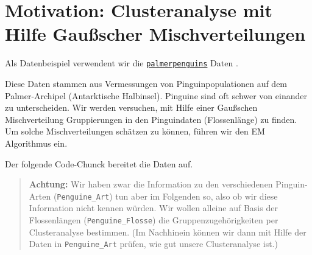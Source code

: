 \documentclass[
  ngerman,
]{book}
\begin{document}
\hypertarget{motivation-clusteranalyse-mit-hilfe-gauuxdfscher-mischverteilungen}{%
\section{Motivation: Clusteranalyse mit Hilfe Gaußscher Mischverteilungen}\label{motivation-clusteranalyse-mit-hilfe-gauuxdfscher-mischverteilungen}}

Als Datenbeispiel verwendent wir die \href{https://allisonhorst.github.io/palmerpenguins/articles/intro.html}{\texttt{palmerpenguins}} Daten \citep{palmerpenguins}.

Diese Daten stammen aus Vermessungen von Pinguinpopulationen auf dem Palmer-Archipel (Antarktische Halbinsel). Pinguine sind oft schwer von einander zu unterscheiden. Wir werden versuchen, mit Hilfe einer Gaußschen Mischverteilung Gruppierungen in den Pinguindaten (Flossenlänge) zu finden. Um solche Mischverteilungen schätzen zu können, führen wir den EM Algorithmus ein.

Der folgende Code-Chunck bereitet die Daten auf.

\begin{quote}
\textbf{Achtung:} Wir haben zwar die Information zu den verschiedenen Pinguin-Arten (\texttt{Penguine\_Art}) tun aber im Folgenden so, also ob wir diese Information nicht kennen würden. Wir wollen alleine auf Basis der Flossenlängen (\texttt{Penguine\_Flosse}) die Gruppenzugehörigkeiten per Clusteranalyse bestimmen. (Im Nachhinein können wir dann mit Hilfe der Daten in \texttt{Penguine\_Art} prüfen, wie gut unsere Clusteranalyse ist.)
\end{quote}
\end{document}
